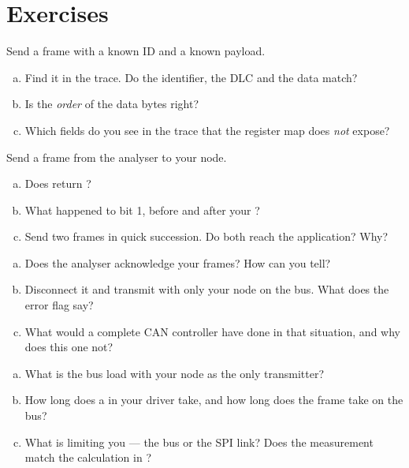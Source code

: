 \section*{Exercises}

\label{ex:14:1}
Send a frame with a known ID and a known payload.
\begin{enumerate}[a)]
  \item Find it in the trace. Do the identifier, the DLC and the data match?
  \item Is the \emph{order} of the data bytes right?
  \item Which fields do you see in the trace that the register map does \emph{not} expose?
\end{enumerate}

\label{ex:14:2}
Send a frame from the analyser to your node.
\begin{enumerate}[a)]
  \item Does  return ?
  \item What happened to  bit 1, before and after your ?
  \item Send two frames in quick succession. Do both reach the application? Why?
\end{enumerate}

\label{ex:14:3}
\begin{enumerate}[a)]
  \item Does the analyser acknowledge your frames? How can you tell?
  \item Disconnect it and transmit with only your node on the bus. What does the error flag say?
  \item What would a complete CAN controller have done in that situation, and why does this one
    not?
\end{enumerate}

\label{ex:14:4}
\begin{enumerate}[a)]
  \item What is the bus load with your node as the only transmitter?
  \item How long does a  in your driver take, and how long does the frame take on the
    bus?
  \item What is limiting you --- the bus or the SPI link? Does the measurement match the
    calculation in ?
\end{enumerate}
